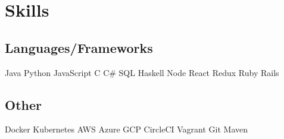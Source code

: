 \documentclass[]{deedy-resume}
\begin{document}
\section{Skills}
\begin{minipage}[t]{1.0\textwidth}
\subsection{Languages/Frameworks}
Java \textbullet{} Python \textbullet{} JavaScript \textbullet{} C \textbullet{}
C\# \textbullet{} SQL \textbullet{} Haskell \textbullet{}
Node \textbullet{} React \textbullet{} Redux \textbullet{} Ruby \textbullet{} Rails
\sectionsep
\subsection{Other}
Docker \textbullet{} Kubernetes \textbullet{} AWS \textbullet{} Azure \textbullet{} GCP
\textbullet{} CircleCI \textbullet{} Vagrant \textbullet{} Git \textbullet{} Maven
\sectionsep
\end{minipage}
\hfill
\end{document}
